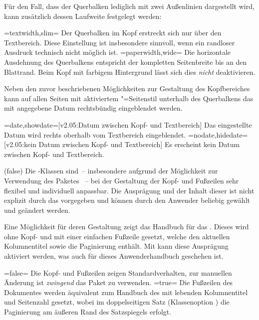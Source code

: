 \begin{DeclareEntity*}{}
\begin{DeclareEntity*}{}
\begin{DeclareEntity*}{}
\begin{Declaration}
Für den Fall, dass der Querbalken lediglich mit zwei Außenlinien dargestellt 
wird, kann zusätzlich dessen Laufweite festgelegt werden:
\begin{DeclareValues}
\itemval=textwidth,slim=
  Der Querbalken im Kopf erstreckt sich nur über den Textbereich. Diese 
  Einstellung ist insbesondere sinnvoll, wenn ein randloser Ausdruck technisch 
  nicht möglich ist. 
\itemval=paperwidth,wide=
  Die horizontale Ausdehnung des Querbalkens entspricht der kompletten 
  Seitenbreite bis an den Blattrand. Beim Kopf mit farbigem Hintergrund lässt 
  sich dies \emph{nicht} deaktivieren.
\end{DeclareValues}

Neben den zuvor beschriebenen Möglichkeiten zur Gestaltung des Kopfbereiches 
kann auf allen Seiten mit aktiviertem "=Seitenstil 
unterhalb des Querbalkens das mit  angegebene Datum rechtsbündig 
eingeblendet werden.
\begin{DeclareValues}
\itemval=date,showdate=[v2.05:Datum zwischen Kopf- und Textbereich]
  Das eingestellte Datum wird rechts oberhalb vom Textbereich eingeblendet.
\itemval=nodate,hidedate=[v2.05:kein Datum zwischen Kopf- und Textbereich]
  Es erscheint kein Datum zwischen Kopf- und Textbereich.
\end{DeclareValues}
\end{Declaration}

\begin{Declaration}
  {}
  (false)%
Die \TUDScript-Klassen sind~-- insbesondere aufgrund der Möglichkeit zur 
Verwendung des Paketes ~-- bei der Gestaltung der 
Kopf- und Fußzeilen sehr flexibel und individuell anpassbar. Die Ausprägung und 
der Inhalt dieser ist nicht explizit durch das \CD vorgegeben und können durch 
den Anwender beliebig gewählt und geändert werden. 

Eine Möglichkeit für deren Gestaltung zeigt das Handbuch für das \TUDCD. Dieses 
wird ohne Kopf- und mit einer einfachen Fußzeile gesetzt, welche den aktuellen 
Kolumnentitel sowie die Paginierung enthält. Mit  kann diese 
Ausprägung aktiviert werden, was auch für dieses Anwenderhandbuch geschehen ist.
\begin{DeclareValues}
\itemval=false=
  Die Kopf- und Fußzeilen zeigen Standardverhalten, zur manuellen Änderung 
  ist \emph{zwingend} das Paket  zu verwenden.
\itemval*=true=
  Die Fußzeilen des Dokumentes werden äquivalent zum Handbuch des \TUDCDs mit 
  lebenden Kolumnentitel und Seitenzahl gesetzt, wobei im doppelseitigen Satz 
  (Klassenoption ) die Paginierung am äußeren Rand des 
  Satzspiegels erfolgt.
\end{DeclareValues}


\end{Declaration}
\end{DeclareEntity*}
\end{DeclareEntity*}
\end{DeclareEntity*}
